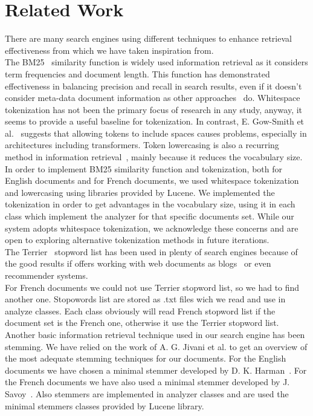 \section{Related Work}
\label{sec:related}

There are many search engines using different techniques to enhance retrieval effectiveness from which we have taken
inspiration from.\\

The BM25~\cite{BM25} similarity function is widely used information retrieval as it considers term frequencies and
document length.
This function has demonstrated effectiveness in balancing precision and recall in search results, even if it
doesn't consider meta-data document information as other approaches~\cite{robertson2009probabilistic} do.
Whitespace tokenization has not been the primary focus of research in any study, anyway, it seems to provide a useful
baseline for tokenization.
In contrast, E. Gow-Smith et al.~\cite{gowsmith2022improving} suggests that allowing tokens to include spaces causes problems,
especially in architectures including transformers.
Token lowercasing is also a recurring method in information retrieval~\cite{manning2008introduction}, mainly because it
reduces the vocabulary size. In order to implement BM25 similarity function and tokenization, both for English documents and 
for French documents, we used whitespace tokenization and lowercasing using libraries provided by Lucene. 
We implemented the tokenization in order to get advantages 
in the vocabulary size, using it in each class which implement 
the analyzer for that specific documents set. While our system
adopts whitespace tokenization, we acknowledge these concerns and are open to exploring alternative tokenization 
methods in future iterations.\\

The Terrier~\cite{OunisEtAl2006} stopword list has been used in plenty of search engines because of the good results if
offers working with web documents as blogs~\cite{ounis2009overview} or even recommender systems. \\
For French documents we could not use Terrier stopword list, so we had to find another one\cite{stopword-fr}.
Stopowords list are stored as .txt files wich we read and use in analyze classes. Each class obviously will read French stopword list if the document set is the French one, otherwise it use the Terrier stopword list. \\

Another basic information retrieval technique used in our search engine has been stemming.
We have relied on the work of A. G. Jivani et al.\cite{jivani2011comparative} to get an overview of the most adequate
stemming techniques for our documents.
For the English documents we have chosen a minimal stemmer developed by D. K. Harman~\cite{Harman1991HowEI}.
For the French documents we have also used a minimal stemmer developed by J. Savoy~\cite{frenchStemmer}. Also stemmers are implemented in analyzer classes and are used the minimal stemmers classes provided by Lucene library.\\

